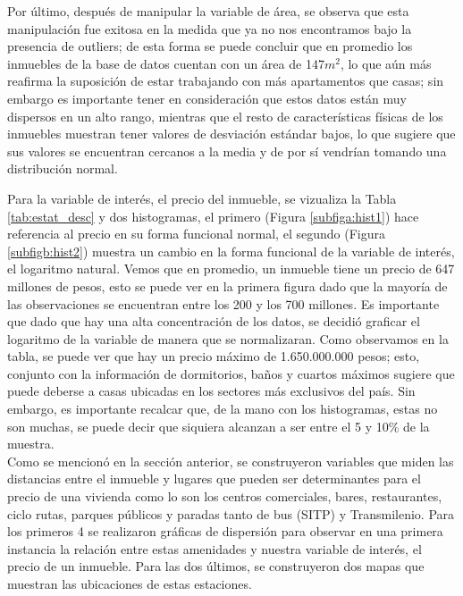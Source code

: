\documentclass[10pt]{article}
\begin{document}
Por último, después de manipular la variable de área, se observa que esta manipulación fue exitosa en la medida que ya no nos encontramos bajo la presencia de outliers; de esta forma se puede concluir que en promedio los inmuebles de la base de datos cuentan con un área de 147$m^2$, lo que aún más reafirma la suposición de estar trabajando con más apartamentos que casas; sin embargo es importante tener en consideración que estos datos están muy dispersos en un alto rango, mientras que el resto de características físicas de los inmuebles muestran tener valores de desviación estándar bajos, lo que sugiere que sus valores se encuentran cercanos a la media y de por sí vendrían tomando una distribución normal. 



Para la variable de interés, el precio del inmueble, se vizualiza  la Tabla \ref{tab:estat_desc} y dos histogramas, el primero (Figura \ref{subfiga:hist1}) hace referencia al precio en su forma funcional normal, el segundo (Figura \ref{subfigb:hist2}) muestra un cambio en la forma funcional de la variable de interés, el logaritmo natural. Vemos que en promedio, un inmueble tiene un precio de 647 millones de pesos, esto se puede ver en la primera figura dado que la mayoría de las observaciones se encuentran entre los 200 y los 700 millones. Es importante que dado que hay una alta concentración de los datos, se decidió graficar el logaritmo de la variable de manera que se normalizaran. Como observamos en la tabla, se puede ver que hay un precio máximo de 1.650.000.000 pesos; esto, conjunto con la información de dormitorios, baños y cuartos máximos sugiere que puede deberse a casas ubicadas en los sectores más exclusivos del país. Sin embargo, es importante recalcar que, de la mano con los histogramas, estas no son muchas, se puede decir que siquiera alcanzan a ser entre el 5 y 10\% de la muestra. \\

Como se mencionó en la sección anterior, se construyeron variables que miden las distancias entre el inmueble y lugares que pueden ser determinantes para el precio de una vivienda como lo son los centros comerciales, bares, restaurantes, ciclo rutas, parques públicos y paradas tanto de bus (SITP) y Transmilenio. Para los primeros 4 se realizaron gráficas de dispersión para observar en una primera instancia la relación entre estas amenidades y nuestra variable de interés, el precio de un inmueble. Para las dos últimos, se construyeron dos mapas que muestran las ubicaciones de estas estaciones.  \\
\end{document}
